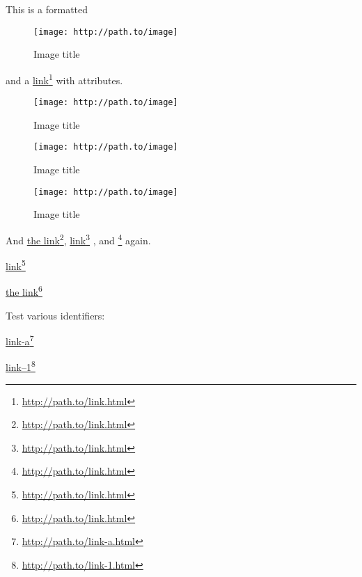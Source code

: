 
\def\mytitle{Link Attributes Test}
\def\latexmode{memoir}

This is a formatted \begin{figure}[htbp]
\centering
\texttt{[image: http://path.to/image]}
\caption{Image title}
\label{image}
\end{figure}
 and a \href{http://path.to/link.html}{link}\footnote{\href{http://path.to/link.html}{http:\slash \slash path.to\slash link.html}} with attributes.

\begin{figure}[htbp]
\centering
\texttt{[image: http://path.to/image]}
\caption{Image title}
\label{image2}
\end{figure}


\begin{figure}[htbp]
\centering
\texttt{[image: http://path.to/image]}
\caption{Image title}
\label{image3}
\end{figure}


\begin{figure}[htbp]
\centering
\texttt{[image: http://path.to/image]}
\caption{Image title}
\label{image4}
\end{figure}


And \href{http://path.to/link.html}{the link}\footnote{\href{http://path.to/link.html}{http:\slash \slash path.to\slash link.html}}, \href{http://path.to/link.html}{link}\footnote{\href{http://path.to/link.html}{http:\slash \slash path.to\slash link.html}} , and \href{http://path.to/link.html}{}\footnote{\href{http://path.to/link.html}{http:\slash \slash path.to\slash link.html}} again.

\href{http://path.to/link.html}{link}\footnote{\href{http://path.to/link.html}{http:\slash \slash path.to\slash link.html}}

\href{http://path.to/link.html}{the link}\footnote{\href{http://path.to/link.html}{http:\slash \slash path.to\slash link.html}}

Test various identifiers:

\href{http://path.to/link-a.html}{link-a}\footnote{\href{http://path.to/link-a.html}{http:\slash \slash path.to\slash link-a.html}}

\href{http://path.to/link-1.html}{link--1}\footnote{\href{http://path.to/link-1.html}{http:\slash \slash path.to\slash link-1.html}}

